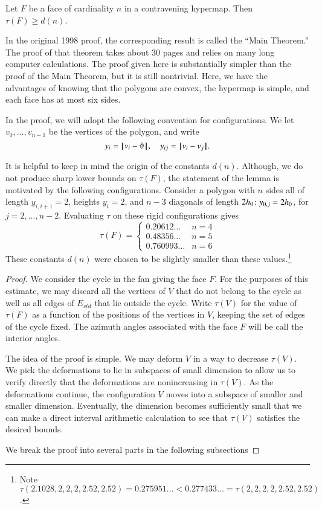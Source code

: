 \begin{lemma} %
Let $F$ be a face of cardinality $n$ in a contravening hypermap.  Then
        $\tau(F) \ge d(n)$.
\end{lemma}

In the original 1998 proof, the corresponding result
is called the ``Main Theorem.''  The proof of that 
theorem takes about 30 pages and relies on many
long computer calculations.  The proof given here
is substantially simpler than the proof of the
Main Theorem, but
it is still nontrivial.  Here, we have the advantages
of knowing that the polygons are convex, the hypermap
is simple, and each face has at most six sides.

In the proof, we will adopt the following convention for
configurations.  We let $v_0,\ldots,v_{n-1}$ be the vertices
of the polygon, and write
$$
y_i = \norm{v_i}{\orgn},\quad y_{ij} = \norm{v_i}{ v_j}.
$$

It is helpful to keep in mind the origin of the constants $d(n)$.
Although, we do not produce sharp lower bounds on $\tau(F)$, the
statement of the lemma is motivated by the following configurations.
Consider a polygon with $n$ sides all of length $y_{i,i+1}=2$, heights
$y_i=2$, and $n-3$ diagonals of length $2{h_0}$: $y_{0,j}=2{h_0}$, for
$j=2,\ldots,n-2$.  Evaluating $\tau$ on these rigid configurations gives
$$
\tau(F) = \begin{cases}
0.20612\ldots & n=4\\
0.48356\ldots & n=5\\
0.760993\ldots &n=6
\end{cases}
$$
These constants $d(n)$ were chosen to be slightly smaller than these values.\footnote{Note $\tau(2.1028,2,2,2,2.52,2.52) = 0.275951\ldots < 0.277433\ldots = \tau(2,2,2,2,2.52,2.52)$.}


\begin{proof}  We consider the cycle in the fan
giving the face $F$.  For the purposes of this
estimate, we may discard all the vertices of $V$
that do not belong to the cycle as well as all edges
of $E_{std}$ that lie outside the cycle.
Write $\tau(V)$ for the value of $\tau(F)$ as a
function of the positions of the vertices in $V$,
keeping the set of edges of the cycle fixed.  The
azimuth angles associated with the face $F$ will be
call the interior angles.  

The idea of the proof is simple.  We may deform $V$ in a way to decrease $\tau(V)$.  We pick the deformations to lie in subspaces of small dimension to allow us to verify directly that the deformations are nonincreasing in $\tau(V)$.  As the deformations continue, the configuration $V$ moves into a subspace of smaller and smaller dimension.  Eventually, the dimension becomes sufficiently small that we can make a direct interval arithmetic calculation to see that $\tau(V)$ satisfies the desired bounds.

We break the proof into several parts in the following
subsections
\end{proof}



